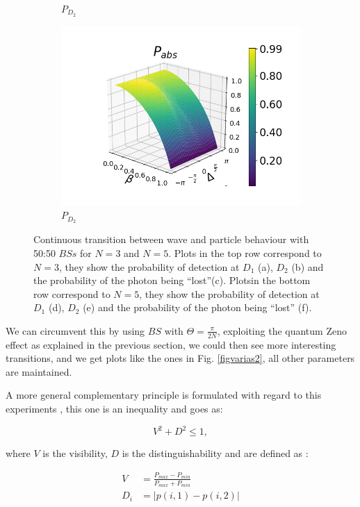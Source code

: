 \documentclass[12pt]{book}
\begin{document}
\begin{figure}[t!]
\begin{subfigure}[b]{0.3\linewidth}
\caption{$P_{D_{2}}$ }
\label{fig:BS1}
\end{subfigure}
\begin{subfigure}[b]{0.3\linewidth}
\includegraphics[width=\linewidth]{images/pabs_5_pi4.png}
\caption{$P_{D_{2}}$ }
\label{fig:BS1}
\end{subfigure}
\caption{Continuous transition between wave and particle behaviour with 50:50 $BSs$ for $N=3$ and $N=5$. Plots in the top row correspond to $N=3$, they show the probability of detection at $D_{1}$ (a), $D_{2}$ (b) and the probability of the photon being ``lost''(c). Plotsin the bottom row correspond to $N=5$, they show the probability of detection at $D_{1}$ (d),  $D_{2}$ (e) and the probability of the photon being ``lost'' (f).}
\label{varias}
\end{figure}


We can circumvent this by using $BS$ with $\Theta=\frac{\pi}{2N}$, exploiting the quantum Zeno effect as explained in the previous section, we could then see more interesting transitions, and we get plots like the ones in Fig. \ref{figvarias2}, all other parameters are maintained.

A more general complementary principle is formulated with regard to this experiments \cite{Ma}, this one is an inequality and goes as:

\begin{equation}
 V^{2} + D^{2} \leq 1,
\end{equation}

where $V$ is the visibility, $D$ is the distinguishability and are defined as :

\begin{align}
 V&= \frac{P_{max}-P_{min}}{P_{max}+P_{min}}\\
 D_{i}&=|p(i,1)-p(i,2)|
\end{align}
\end{document}
